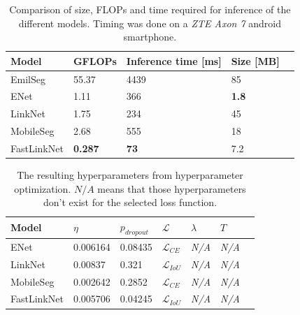 \documentclass{kththesis}
\begin{document}
\begin{table}[]
\centering
\caption{Comparison of size, FLOPs and time required for inference of the
  different models. Timing was done on a \textit{ZTE Axon 7} android smartphone.}
\label{tab:res_resources}
\begin{tabular}{@{}lllll@{}}
\toprule
Model       &  GFLOPs  & Inference time {[}ms{]} & Size {[}MB{]}  \\ \midrule
EmilSeg     &  55.37   & 4439                    & 85             \\
  ENet        &  1.11    & 366                     & \textbf{1.8}            \\
LinkNet     &  1.75    & 234                     & 45             \\
MobileSeg   &  2.68    & 555                     & 18             \\
FastLinkNet &  \textbf{0.287}   & \textbf{73}                      & 7.2            \\ \bottomrule
\end{tabular}
\end{table}

\begin{table}[]
\centering
\caption{The resulting hyperparameters from hyperparameter optimization. \(\textit{N/A}\)
means that those hyperparameters don't exist for the selected loss function.}
\label{tab:res_hyper}
\begin{tabular}{@{}lllllll@{}}
\toprule
Model       & \(\eta\) & \(p_{dropout}\) & \(\mathcal{L}\) & \(\lambda\) & \(T\)\\ \midrule
ENet       & 0.006164 & 0.08435 & \(\mathcal{L}_{ CE }\) & \textit{N/A} & \textit{N/A}\\
LinkNet    & 0.00837 & 0.321 & \(\mathcal{L}_{ IoU } \) & \textit{N/A} & \textit{N/A}\\
MobileSeg   & 0.002642 & 0.2852 & \(\mathcal{L}_{ CE }\) & \textit{N/A} & \textit{N/A}\\
FastLinkNet  & 0.005706 & 0.04245 & \(\mathcal{L}_{ IoU }\) & \textit{N/A} & \textit{N/A}\\\bottomrule
\end{tabular}
\end{table}
\end{document}
